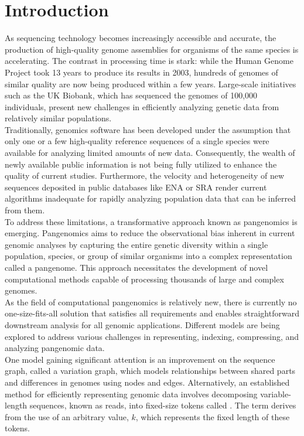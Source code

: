 \chapter{Introduction}
\label{sec:intro}
As sequencing technology becomes increasingly accessible and accurate, the production of high-quality genome assemblies for organisms of the same species is accelerating. The contrast in processing time is stark: while the Human Genome Project took 13 years to produce its results in 2003, hundreds of genomes of similar quality are now being produced within a few years. Large-scale initiatives such as the UK Biobank, which has sequenced the genomes of 100,000 individuals, present new challenges in efficiently analyzing genetic data from relatively similar populations.\\
Traditionally, genomics software has been developed under the assumption that only one or a few high-quality reference sequences of a single species were available for analyzing limited amounts of new data. Consequently, the wealth of newly available public information is not being fully utilized to enhance the quality of current studies. Furthermore, the velocity and heterogeneity of new sequences deposited in public databases like ENA or SRA render current algorithms inadequate for rapidly analyzing population data that can be inferred from them.\\
To address these limitations, a transformative approach known as pangenomics is emerging. Pangenomics aims to reduce the observational bias inherent in current genomic analyses by capturing the entire genetic diversity within a single population, species, or group of similar organisms into a complex representation called a pangenome. This approach necessitates the development of novel computational methods capable of processing thousands of large and complex genomes.\\
As the field of computational pangenomics is relatively new, there is currently no one-size-fits-all solution that satisfies all requirements and enables straightforward downstream analysis for all genomic applications. Different models are being explored to address various challenges in representing, indexing, compressing, and analyzing pangenomic data.\\
One model gaining significant attention is an improvement on the sequence graph, called a variation graph, which models relationships between shared parts and differences in genomes using nodes and edges. Alternatively, an established method for efficiently representing genomic data involves decomposing variable-length sequences, known as reads, into fixed-size tokens called \kmers. The term \kmer derives from the use of an arbitrary value, $k$, which represents the fixed length of these tokens.\\
